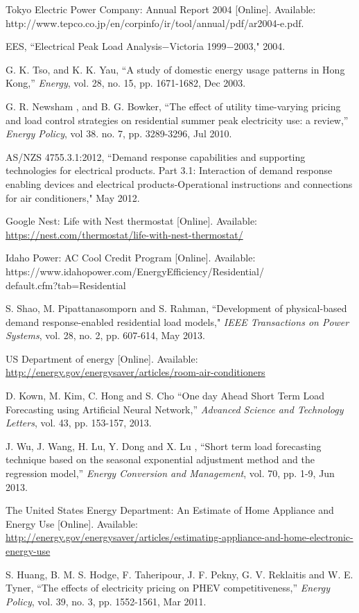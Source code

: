 \documentclass[10pt,twocolumn,twoside]{IEEEtran}
\begin{document}
\begin{thebibliography}{99}
 Tokyo Electric Power Company: Annual Report 2004 [Online]. Available: 
http://www.tepco.co.jp/en/corpinfo/ir/tool/annual/pdf/ar2004-e.pdf. 

 EES, ``Electrical Peak Load Analysis$-$Victoria 1999$-$2003," 2004. 


 G. K. Tso, and K. K. Yau, ``A study of domestic energy usage patterns in Hong Kong,'' \textit{Energy}, vol. 28, no. 15, pp. 1671-1682, Dec 2003.

 G. R. Newsham , and B. G. Bowker, ``The effect of utility time-varying pricing and load control strategies on residential summer peak electricity use: a review,'' \textit{Energy Policy}, vol 38. no. 7, pp. 3289-3296, Jul 2010.


 AS/NZS 4755.3.1:2012, ``Demand response capabilities and supporting technologies for electrical products. Part 3.1: Interaction of demand response enabling devices and electrical products-Operational instructions and connections for air conditioners," May 2012.




 Google Nest: Life with Nest thermostat [Online]. Available: \url{https://nest.com/thermostat/life-with-nest-thermostat/}

 Idaho Power: AC Cool Credit Program [Online]. 
Available:
https://www.idahopower.com/EnergyEfficiency/Residential/\\default.cfm?tab=Residential

 S. Shao, M. Pipattanasomporn and S. Rahman, ``Development of physical-based demand response-enabled residential load models," \textit{IEEE Transactions on Power Systems}, vol. 28, no. 2, pp. 607-614, May 2013.



 US Department of energy [Online]. Available: \url{http://energy.gov/energysaver/articles/room-air-conditioners}

 D. Kown, M. Kim, C. Hong and S. Cho ``One day Ahead Short Term Load Forecasting using Artificial Neural Network,'' \textit{Advanced Science and Technology Letters}, vol. 43, pp. 153-157, 2013.



 J. Wu, J. Wang, H. Lu, Y. Dong and X. Lu , ``Short term load forecasting technique based on the seasonal exponential adjustment method and the regression model,'' \textit{Energy Conversion and Management}, vol. 70, pp. 1-9, Jun 2013.


 The United States Energy Department: An Estimate of Home Appliance and Energy Use [Online]. Available: \url{http://energy.gov/energysaver/articles/estimating-appliance-and-home-electronic-energy-use}



 S. Huang, B. M. S. Hodge, F. Taheripour, J. F. Pekny, G. V. Reklaitis and W. E. Tyner, ``The effects of electricity pricing on PHEV competitiveness,''  \textit{Energy Policy}, vol. 39, no. 3, pp. 1552-1561, Mar 2011.



\end{thebibliography}
\end{document}
